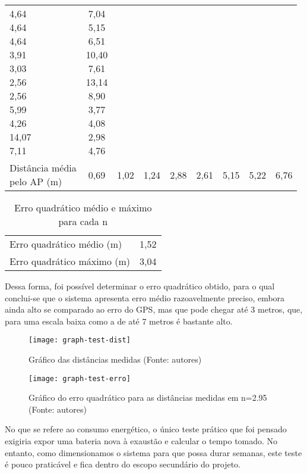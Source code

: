 \begin{table}[ht]
\begin{tabular}{l|cccccccc}
\makecell{4,64 \\ 4,64 \\ 4,64 \\ 3,91 \\ 3,03 \\ 2,56 \\ 2,56 \\ 5,99 \\ 4,26 \\ 14,07 \\ 7,11} &
\makecell{7,04 \\ 5,15 \\ 6,51 \\ 10,40 \\ 7,61 \\ 13,14 \\ 8,90 \\ 3,77 \\ 4,08 \\ 2,98 \\ 4,76}
\vspace{0.4cm}\\

\makecell{Distância média \\ pelo AP (m)} & 0,69 & 1,02 & 1,24 & 2,88 & 2,61 & 5,15 & 5,22 & 6,76
\end{tabular}
\end{table}

\begin{table}[ht]
\centering
\caption{Erro quadrático médio e máximo para cada n}
\vspace{0.5cm}
\begin{tabular}{l|c}
\hline
Erro quadrático médio (m) & 1,52 \vspace{0.4cm}\\
Erro quadrático máximo (m) & 3,04
\end{tabular}
\end{table}

Dessa forma, foi possível determinar o erro quadrático obtido, para o qual conclui-se que o sistema apresenta erro médio razoavelmente preciso, embora ainda alto se comparado ao erro do GPS, mas que pode chegar até 3 metros, que, para uma escala baixa como a de até 7 metros é bastante alto. 

\begin{figure}[ht]
  \centering
    \texttt{[image: graph-test-dist]}
  \caption{Gráfico das distâncias medidas (Fonte: autores)}
\end{figure}

\begin{figure}[ht]
  \centering
    \texttt{[image: graph-test-erro]}
  \caption{Gráfico do erro quadrático para as distâncias medidas em n=2.95 (Fonte: autores)}
\end{figure}

No que se refere ao consumo energético, o único teste prático que foi pensado exigiria expor uma bateria nova à exaustão e calcular o tempo tomado. No entanto, como dimensionamos o sistema para que possa durar semanas, este teste é pouco praticável e fica dentro do escopo secundário do projeto.
